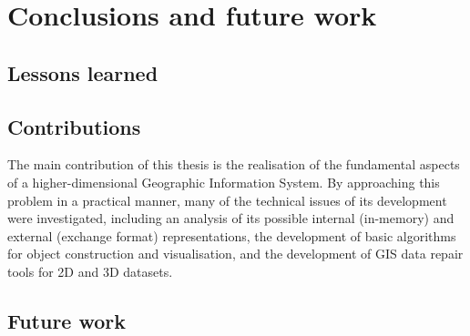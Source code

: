 
\chapter{Conclusions and future work}
\label{ch:conclusions}




\section{Lessons learned}
\label{se:conclusions}


\section{Contributions}
\label{se:contributions}

The main contribution of this thesis is the realisation of the fundamental aspects of a higher-dimensional Geographic Information System.
By approaching this problem in a practical manner, many of the technical issues of its development were investigated, including an analysis of its possible internal (in-memory) and external (exchange format) representations, the development of basic algorithms for object construction and visualisation, and the development of GIS data repair tools for 2D and 3D datasets.



\section{Future work}
\label{se:futurework}

